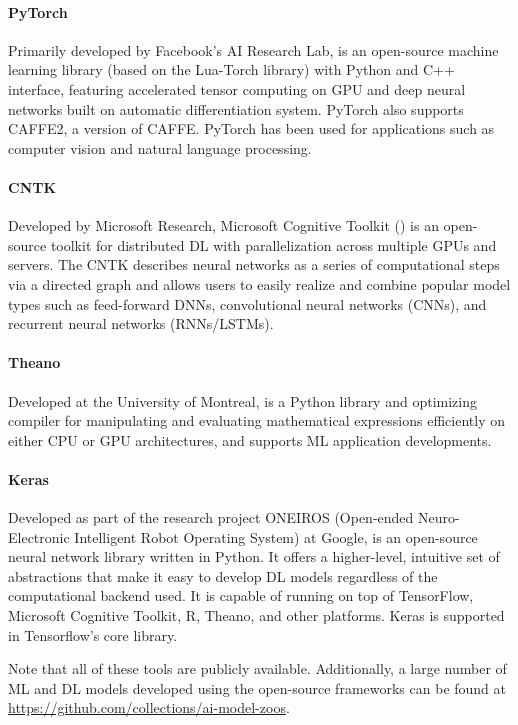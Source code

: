 \paragraph{PyTorch} 
Primarily developed by Facebook's AI Research Lab,  is an open-source machine learning library (based on the Lua-Torch library) with Python and C++ interface, featuring accelerated tensor computing on GPU and deep neural networks built on automatic differentiation system. PyTorch also supports CAFFE2, a version of CAFFE. PyTorch has been used for applications such as computer vision and natural language processing. 

\paragraph{CNTK} 
Developed by Microsoft Research, Microsoft Cognitive Toolkit () is an open-source toolkit for distributed DL with parallelization across multiple GPUs and servers. The CNTK describes neural networks as a series of computational steps via a directed graph and allows users to easily realize and combine popular model types such as feed-forward DNNs, convolutional neural networks (CNNs), and recurrent neural networks (RNNs/LSTMs).

\paragraph{Theano} 
Developed at the University of Montreal,  is a Python library and optimizing compiler for manipulating and evaluating mathematical expressions efficiently on either CPU or GPU architectures, and supports ML application developments. 

\paragraph{Keras} 
Developed as part of the research project ONEIROS (Open-ended Neuro-Electronic Intelligent Robot Operating System) at Google,  is an open-source neural network library written in Python. It offers a higher-level, intuitive set of abstractions that make it easy to develop DL models regardless of the computational backend used. It is capable of running on top of TensorFlow, Microsoft Cognitive Toolkit, R, Theano, and other platforms. Keras is supported in Tensorflow's core library. 



Note that all of these tools are publicly available. Additionally, a large number of ML and DL models developed using the open-source frameworks can be found at \url{https://github.com/collections/ai-model-zoos}.

